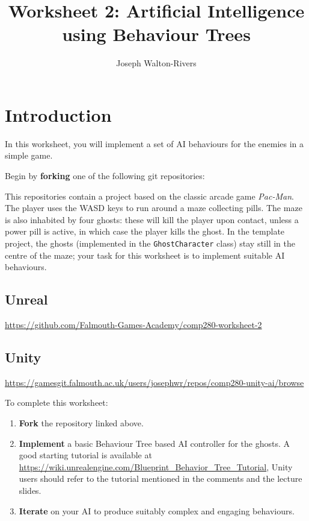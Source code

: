 \documentclass{../../../fal_assignment}
\title{Worksheet 2: Artificial Intelligence using Behaviour Trees}
\author{Joseph Walton-Rivers}
\begin{document}
\maketitle


\section*{Introduction}

In this worksheet, you will implement a set of AI behaviours for the enemies in a simple game.

Begin by \textbf{forking} one of the following git repositories:

This repositories contain a  project based on the classic arcade game \emph{Pac-Man}.
The player uses the WASD keys to run around a maze collecting pills.
The maze is also inhabited by four ghosts:
these will kill the player upon contact, unless a power pill is active, in which case the player kills the ghost.
In the template project, the ghosts (implemented in the \texttt{GhostCharacter} class) stay still in the centre of the maze;
your task for this worksheet is to implement suitable AI behaviours.

\subsection*{Unreal}
\begin{center}
	\url{https://github.com/Falmouth-Games-Academy/comp280-worksheet-2}
\end{center}

\subsection*{Unity}

\begin{center}
	\url{https://gamesgit.falmouth.ac.uk/users/josephwr/repos/comp280-unity-ai/browse}
\end{center}

To complete this worksheet:

\begin{enumerate}
	\item \textbf{Fork} the repository linked above.
	\item \textbf{Implement} a basic Behaviour Tree based AI controller for the ghosts.
		A good starting tutorial is available at \url{https://wiki.unrealengine.com/Blueprint\_Behavior\_Tree\_Tutorial}, Unity users should refer to the tutorial mentioned in the comments and the lecture slides.
	\item \textbf{Iterate} on your AI to produce suitably complex and engaging behaviours.
\end{enumerate}
\end{document}
